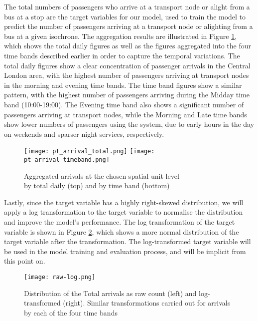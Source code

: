 The total numbers of passengers who arrive at a transport node or alight from a bus at a stop are the target variables for our model, used to train the model to predict the number of passengers arriving at a transport node or alighting from a bus at a given isochrone. 
The aggregation results are illustrated in Figure \ref{fig:ptarrival}, which shows the total daily figures as well as the figures aggregated into the four time bands described earlier in order to capture the temporal variations. The total daily figures show a clear concentration of passenger arrivals in the Central London area, with the highest number of passengers arriving at transport nodes in the morning and evening time bands. The time band figures show a similar pattern, with the highest number of passengers arriving during the Midday time band (10:00-19:00). The Evening time band also shows a significant number of passengers arriving at transport nodes, while the Morning and Late time bands show lower numbers of passengers using the system, due to early hours in the day on weekends and sparser night services, respectively.

\begin{figure}[!b]
    \centering
    \texttt{[image: pt\_arrival\_total.png]}
    \centering
    \texttt{[image: pt\_arrival\_timeband.png]}
    \captionsetup{justification=centering}
    \caption{Aggregated arrivals at the chosen spatial unit level\\ by total daily (top) and by time band (bottom)}
    \label{fig:ptarrival}
\end{figure}

Lastly, since the target variable has a highly right-skewed distribution, we will apply a log transformation to the target variable to normalise the distribution and improve the model's performance. The log transformation of the target variable is shown in Figure \ref{fig:rawlog}, which shows a more normal distribution of the target variable after the transformation. The log-transformed target variable will be used in the model training and evaluation process, and will be implicit from this point on.

\begin{figure}[!ht]
    \centering
    \texttt{[image: raw-log.png]}
    \captionsetup{justification=centering}
    \caption{Distribution of the Total arrivals as raw count (left) and log-transformed (right). Similar transformations carried out for arrivals by each of the four time bands}
    \label{fig:rawlog}
\end{figure}
